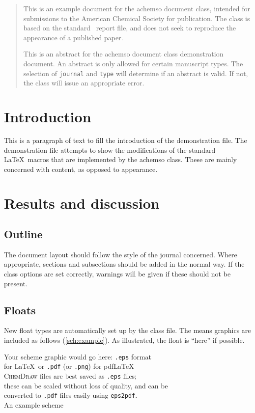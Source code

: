 
	
\begin{abstract}
  This is an example document for the \textsf{achemso} document
  class, intended for submissions to the American Chemical Society
  for publication. The class is based on the standard \LaTeXe\
  \textsf{report} file, and does not seek to reproduce the appearance
  of a published paper.

  This is an abstract for the \textsf{achemso} document class
  demonstration document.  An abstract is only allowed for certain
  manuscript types.  The selection of \texttt{journal} and
  \texttt{type} will determine if an abstract is valid.  If not, the
  class will issue an appropriate error.
\end{abstract}


\section{Introduction}
This is a paragraph of text to fill the introduction of the
demonstration file.  The demonstration file attempts to show the
modifications of the standard \LaTeX\ macros that are implemented by
the \textsf{achemso} class.  These are mainly concerned with content,
as opposed to appearance.

\section{Results and discussion}

\subsection{Outline}
The document layout should follow the style of the journal concerned.
Where appropriate, sections and subsections should be added in the
normal way. If the class options are set correctly, warnings will be
given if these should not be present.


\subsection{Floats}

New float types are automatically set up by the class file.  The
means graphics are included as follows (\ref{sch:example}).  As
illustrated, the float is ``here'' if possible.
\begin{scheme}
  Your scheme graphic would go here: \texttt{.eps} format\\
  for \LaTeX\, or \texttt{.pdf} (or \texttt{.png}) for pdf\LaTeX\\
  \textsc{ChemDraw} files are best saved as \texttt{.eps} files;\\
  these can be scaled without loss of quality, and can be\\
  converted to \texttt{.pdf} files easily using \texttt{eps2pdf}.\\
  \caption{An example scheme}
  \label{sch:example}
\end{scheme}

